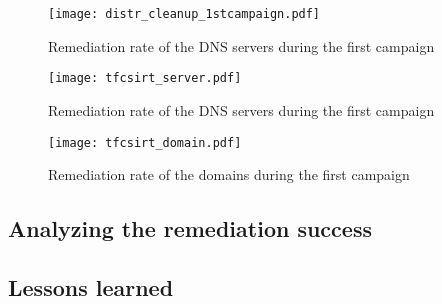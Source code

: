 \begin{figure}[!hbt]
\centering
\texttt{[image: distr\_cleanup\_1stcampaign.pdf]}
\caption{Remediation rate of the DNS servers during the first campaign}
\end{figure}

\begin{figure}[!hbt]
\centering
\texttt{[image: tfcsirt\_server.pdf]}
\caption{Remediation rate of the DNS servers during the first campaign}
\end{figure}

\begin{figure}[!hbt]
\centering
\texttt{[image: tfcsirt\_domain.pdf]}
\caption{Remediation rate of the domains during the first campaign }
\end{figure}



\subsection{Analyzing the remediation success}
\subsection{Lessons learned}